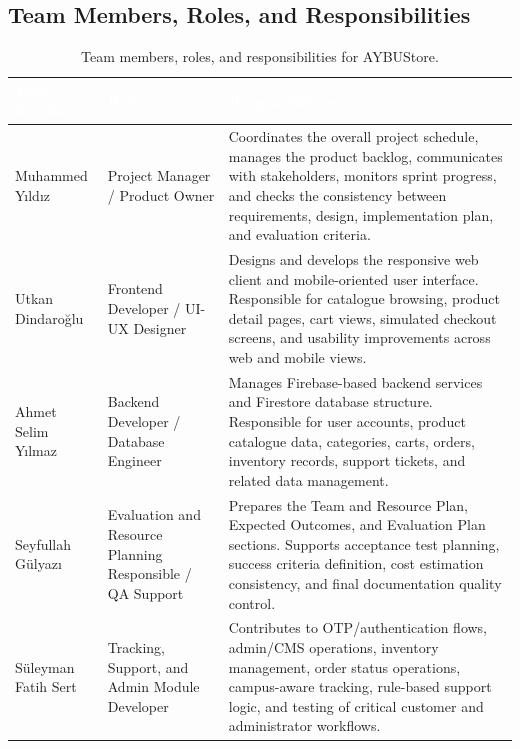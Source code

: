\documentclass[11pt,a4paper]{article}
\begin{document}
\subsection{Team Members, Roles, and Responsibilities}
 
\renewcommand{\arraystretch}{1.25}
\begin{table}[H]
\centering
\small
\begin{tabularx}{\textwidth}{|p{}|p{}|X|}
\hline
\rowcolor{aybuHeader}
\textcolor{white}{\textbf{Team Member}} &
\textcolor{white}{\textbf{Role}} &
\textcolor{white}{\textbf{Responsibilities}} \\ \hline
 
Muhammed Yıldız &
Project Manager / Product Owner &
Coordinates the overall project schedule, manages the product backlog,
communicates with stakeholders, monitors sprint progress, and checks the
consistency between requirements, design, implementation plan, and
evaluation criteria. \\ \hline
 
Utkan Dindaroğlu &
Frontend Developer / UI-UX Designer &
Designs and develops the responsive web client and mobile-oriented user
interface. Responsible for catalogue browsing, product detail pages, cart
views, simulated checkout screens, and usability improvements across web
and mobile views. \\ \hline
 
Ahmet Selim Yılmaz &
Backend Developer / Database Engineer &
Manages Firebase-based backend services and Firestore database structure.
Responsible for user accounts, product catalogue data, categories, carts,
orders, inventory records, support tickets, and related data management. \\ \hline
 
Seyfullah Gülyazı &
Evaluation and Resource Planning Responsible / QA Support &
Prepares the Team and Resource Plan, Expected Outcomes, and Evaluation
Plan sections. Supports acceptance test planning, success criteria
definition, cost estimation consistency, and final documentation quality
control. \\ \hline
 
Süleyman Fatih Sert &
Tracking, Support, and Admin Module Developer &
Contributes to OTP/authentication flows, admin/CMS operations, inventory
management, order status operations, campus-aware tracking, rule-based
support logic, and testing of critical customer and administrator workflows. \\ \hline
 
\end{tabularx}
\caption{Team members, roles, and responsibilities for AYBUStore.}
\label{tab:team-roles}
\end{table}
 
\end{document}
